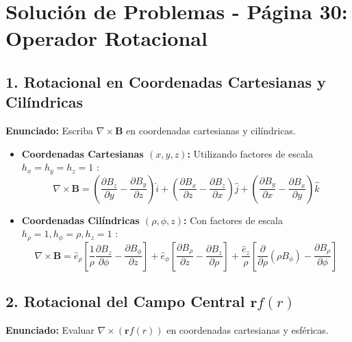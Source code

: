 \documentclass[a4paper]{article}
\begin{document}
\section*{Solución de Problemas - Página 30: Operador Rotacional}

\subsection*{1. Rotacional en Coordenadas Cartesianas y Cilíndricas}
\textbf{Enunciado:} Escriba $\nabla \times \mathbf{B}$ en coordenadas cartesianas y cilíndricas.

\begin{itemize}
    \item \textbf{Coordenadas Cartesianas $(x, y, z)$:} Utilizando factores de escala $h_x = h_y = h_z = 1$ \cite{95, 191}:
    \begin{equation}
        \nabla \times \mathbf{B} = \left( \frac{\partial B_z}{\partial y} - \frac{\partial B_y}{\partial z} \right) \hat{i} + \left( \frac{\partial B_x}{\partial z} - \frac{\partial B_z}{\partial x} \right) \hat{j} + \left( \frac{\partial B_y}{\partial x} - \frac{\partial B_x}{\partial y} \right) \hat{k}
    \end{equation}

    \item \textbf{Coordenadas Cilíndricas $(\rho, \phi, z)$:} Con factores de escala $h_\rho = 1, h_\phi = \rho, h_z = 1$ \cite{95, 191}:
    \begin{equation}
        \nabla \times \mathbf{B} = \hat{e}_\rho \left[ \frac{1}{\rho} \frac{\partial B_z}{\partial \phi} - \frac{\partial B_\phi}{\partial z} \right] + \hat{e}_\phi \left[ \frac{\partial B_\rho}{\partial z} - \frac{\partial B_z}{\partial \rho} \right] + \frac{\hat{e}_z}{\rho} \left[ \frac{\partial}{\partial \rho}(\rho B_\phi) - \frac{\partial B_\rho}{\partial \phi} \right]
    \end{equation}
\end{itemize}

\subsection*{2. Rotacional del Campo Central $\mathbf{r} f(r)$}
\textbf{Enunciado:} Evaluar $\nabla \times (\mathbf{r} f(r))$ en coordenadas cartesianas y esféricas.
\end{document}
